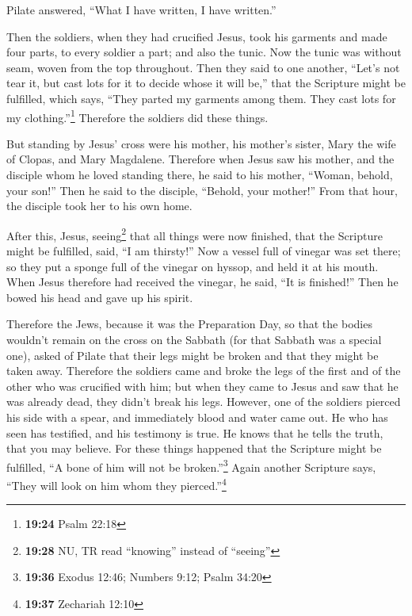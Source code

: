  Pilate answered, ``What I have written, I have
written.''

 Then the soldiers, when they had crucified Jesus, took
his garments and made four parts, to every soldier a part; and also the
tunic. Now the tunic was without seam, woven from the top throughout.
 Then they said to one another, ``Let's not tear it, but
cast lots for it to decide whose it will be,'' that the Scripture might
be fulfilled, which says, ``They parted my garments among them. They
cast lots for my clothing.''\footnote{\textbf{19:24} Psalm 22:18}
Therefore the soldiers did these things.

 But standing by Jesus' cross were his mother, his
mother's sister, Mary the wife of Clopas, and Mary Magdalene.
 Therefore when Jesus saw his mother, and the disciple
whom he loved standing there, he said to his mother, ``Woman, behold,
your son!''  Then he said to the disciple, ``Behold, your
mother!'' From that hour, the disciple took her to his own home.

 After this, Jesus, seeing\footnote{\textbf{19:28} NU, TR
  read ``knowing'' instead of ``seeing''} that all things were now
finished, that the Scripture might be fulfilled, said, ``I am thirsty!''
 Now a vessel full of vinegar was set there; so they put
a sponge full of the vinegar on hyssop, and held it at his mouth.
 When Jesus therefore had received the vinegar, he said,
``It is finished!'' Then he bowed his head and gave up his spirit.

 Therefore the Jews, because it was the Preparation Day,
so that the bodies wouldn't remain on the cross on the Sabbath (for that
Sabbath was a special one), asked of Pilate that their legs might be
broken and that they might be taken away.  Therefore the
soldiers came and broke the legs of the first and of the other who was
crucified with him;  but when they came to Jesus and saw
that he was already dead, they didn't break his legs. 
However, one of the soldiers pierced his side with a spear, and
immediately blood and water came out.  He who has seen
has testified, and his testimony is true. He knows that he tells the
truth, that you may believe.  For these things happened
that the Scripture might be fulfilled, ``A bone of him will not be
broken.''\footnote{\textbf{19:36} Exodus 12:46; Numbers 9:12; Psalm
  34:20}  Again another Scripture says, ``They will look
on him whom they pierced.''\footnote{\textbf{19:37} Zechariah 12:10}

